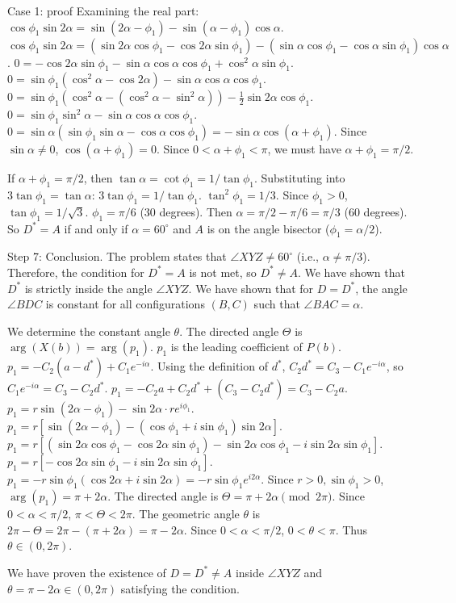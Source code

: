 \documentclass{article} %
\begin{document}
\begin{promptbox}{Case 1: proof}
Examining the real part:
$\cos\phi_1 \sin 2\alpha = \sin(2\alpha-\phi_1) - \sin(\alpha-\phi_1)\cos\alpha$.
$\cos\phi_1 \sin 2\alpha = (\sin 2\alpha\cos\phi_1 - \cos 2\alpha\sin\phi_1) - (\sin\alpha\cos\phi_1 - \cos\alpha\sin\phi_1)\cos\alpha$.
$0 = -\cos 2\alpha\sin\phi_1 - \sin\alpha\cos\alpha\cos\phi_1 + \cos^2\alpha\sin\phi_1$.
$0 = \sin\phi_1(\cos^2\alpha-\cos 2\alpha) - \sin\alpha\cos\alpha\cos\phi_1$.
$0 = \sin\phi_1(\cos^2\alpha-(\cos^2\alpha-\sin^2\alpha)) - \frac{1}{2}\sin 2\alpha\cos\phi_1$.
$0 = \sin\phi_1\sin^2\alpha - \sin\alpha\cos\alpha\cos\phi_1$.
$0 = \sin\alpha(\sin\phi_1\sin\alpha - \cos\alpha\cos\phi_1) = -\sin\alpha\cos(\alpha+\phi_1)$.
Since $\sin\alpha\ne 0$, $\cos(\alpha+\phi_1)=0$. Since $0<\alpha+\phi_1<\pi$, we must have $\alpha+\phi_1=\pi/2$.

If $\alpha+\phi_1=\pi/2$, then $\tan\alpha = \cot\phi_1 = 1/\tan\phi_1$.
Substituting into $3\tan\phi_1 = \tan\alpha$: $3\tan\phi_1 = 1/\tan\phi_1$. $\tan^2\phi_1=1/3$.
Since $\phi_1>0$, $\tan\phi_1=1/\sqrt{3}$. $\phi_1=\pi/6$ (30 degrees).
Then $\alpha=\pi/2-\pi/6=\pi/3$ (60 degrees).
So $D^*=A$ if and only if $\alpha=60^\circ$ and $A$ is on the angle bisector ($\phi_1=\alpha/2$).

Step 7: Conclusion.
The problem states that $\angle XYZ \ne 60^\circ$ (i.e., $\alpha \ne \pi/3$).
Therefore, the condition for $D^*=A$ is not met, so $D^* \ne A$.
We have shown that $D^*$ is strictly inside the angle $\angle XYZ$.
We have shown that for $D=D^*$, the angle $\angle BDC$ is constant for all configurations $(B, C)$ such that $\angle BAC=\alpha$.

We determine the constant angle $\theta$. The directed angle $\Theta$ is $\arg(X(b)) = \arg(p_1)$.
$p_1$ is the leading coefficient of $P(b)$.
$p_1 = -C_2(a-d^*) + C_1 e^{-i\alpha}$.
Using the definition of $d^*$, $C_2 d^* = C_3 - C_1 e^{-i\alpha}$, so $C_1 e^{-i\alpha} = C_3 - C_2 d^*$.
$p_1 = -C_2 a + C_2 d^* + (C_3 - C_2 d^*) = C_3 - C_2 a$.
$p_1 = r\sin(2\alpha-\phi_1) - \sin 2\alpha \cdot re^{i\phi_1}$.
$p_1 = r[\sin(2\alpha-\phi_1) - (\cos\phi_1+i\sin\phi_1)\sin 2\alpha]$.
$p_1 = r[(\sin 2\alpha\cos\phi_1 - \cos 2\alpha\sin\phi_1) - \sin 2\alpha\cos\phi_1 - i\sin 2\alpha\sin\phi_1]$.
$p_1 = r[-\cos 2\alpha\sin\phi_1 - i\sin 2\alpha\sin\phi_1]$.
$p_1 = -r\sin\phi_1 (\cos 2\alpha + i\sin 2\alpha) = -r\sin\phi_1 e^{i2\alpha}$.
Since $r>0, \sin\phi_1>0$, $\arg(p_1) = \pi+2\alpha$.
The directed angle is $\Theta = \pi+2\alpha \pmod{2\pi}$.
Since $0<\alpha<\pi/2$, $\pi < \Theta < 2\pi$.
The geometric angle $\theta$ is $2\pi - \Theta = 2\pi - (\pi+2\alpha) = \pi-2\alpha$.
Since $0<\alpha<\pi/2$, $0 < \theta < \pi$. Thus $\theta \in (0, 2\pi)$.

We have proven the existence of $D=D^* \ne A$ inside $\angle XYZ$ and $\theta=\pi-2\alpha \in (0, 2\pi)$ satisfying the condition.
\end{promptbox}
\end{document}
